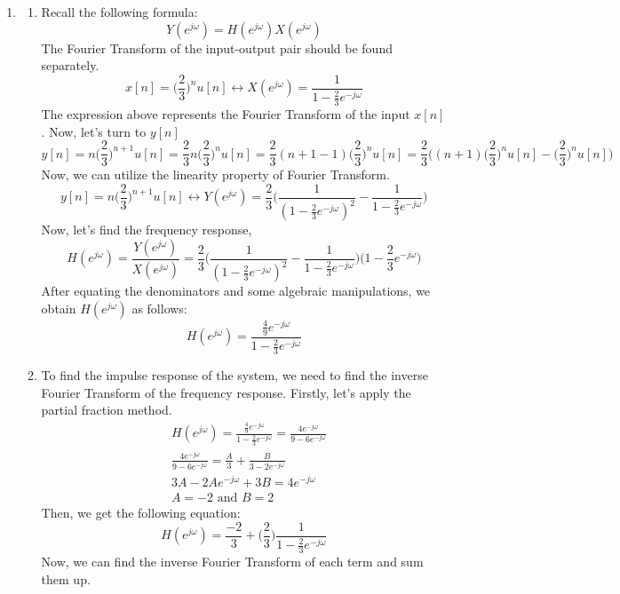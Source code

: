 \documentclass[10pt,a4paper, margin=1in]{article}
\begin{document}
\begin{enumerate}
\item %
    \begin{enumerate}
    \item %
    Recall the following formula:
    $$Y(e^{j\omega})=H(e^{j\omega})X(e^{j\omega})$$
    The Fourier Transform of the input-output pair should be found separately.
    $$x[n]=\biggl(\frac{2}{3}\biggr)^nu[n] \longleftrightarrow X(e^{j\omega})=\frac{1}{1-\frac{2}{3}e^{-j\omega}}$$
    The expression above represents the Fourier Transform of the input $x[n]$. Now, let's turn to $y[n]$
    $$y[n]=n\biggl( \frac{2}{3}\biggr)^{n+1}u[n] = \frac{2}{3}n\biggl( \frac{2}{3}\biggr)^nu[n] = \frac{2}{3}(n+1-1)\biggl( \frac{2}{3}\biggr)^nu[n] = \frac{2}{3} \Biggl( (n+1)\biggl( \frac{2}{3}\biggr)^nu[n]- \biggl( \frac{2}{3}\biggr)^nu[n]\Biggr)$$
    Now, we can utilize the linearity property of Fourier Transform.
    $$y[n]=n\biggl( \frac{2}{3}\biggr)^{n+1}u[n] \longleftrightarrow Y(e^{j\omega})=\frac{2}{3}\biggl(\frac{1}{(1-\frac{2}{3}e^{-j\omega})^2} - \frac{1}{1-\frac{2}{3}e^{-j\omega}} \biggr)$$
    Now, let's find the frequency response,
    $$H(e^{j\omega})=\frac{Y(e^{j\omega})}{X(e^{j\omega})}=\frac{2}{3}\biggl(\frac{1}{(1-\frac{2}{3}e^{-j\omega})^2} - \frac{1}{1-\frac{2}{3}e^{-j\omega}} \biggr)\biggl( 1-\frac{2}{3}e^{-j\omega}\biggr)$$
    After equating the denominators and some algebraic manipulations, we obtain $H(e^{j\omega})$ as follows:
    $$H(e^{j\omega})=\frac{\frac{4}{9}e^{-j\omega}}{1-\frac{2}{3}e^{-j\omega}}$$
    \item %
    To find the impulse response of the system, we need to find the inverse Fourier Transform of the frequency response. Firstly, let's apply the partial fraction method.
    \begin{align*}
        &H(e^{j\omega}) = \frac{\frac{4}{9}e^{-j\omega}}{1-\frac{2}{3}e^{-j\omega}} = \frac{4e^{-j\omega}}{9-6e^{-j\omega}} \\
        &\frac{4e^{-j\omega}}{9-6e^{-j\omega}} = \frac{A}{3} + \frac{B}{3-2e^{-j\omega}}\\
        &3A - 2Ae^{-j\omega}+3B=4e^{-j\omega}\\
        &A=-2 \text{ and } B=2
    \end{align*}
    Then, we get the following equation:
    $$H(e^{j\omega})=\frac{-2}{3} + \biggl(\frac{2}{3}\biggr)\frac{1}{1-\frac{2}{3}e^{-j\omega}}$$
    Now, we can find the inverse Fourier Transform of each term and sum them up.

\end{enumerate}
\end{enumerate}
\end{document}
